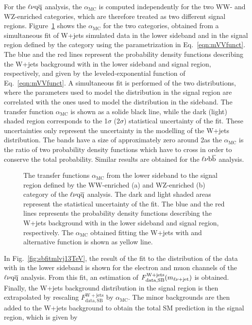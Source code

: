 For the $\ell\nu\mathrm{q}\overline{\mathrm{q}}$ analysis, the $\alpha_\mathrm{MC}$ is computed independently for the two WW- and WZ-enriched categories, which are therefore treated as two different signal regions.
Figure~\ref{fig:alphasWV_13TeV} shows the $\alpha_\mathrm{MC}$ for the two categories, obtained from a simultaneous fit of W+jets simulated data in the lower sideband and in the signal region defined by the category using the parametrization in Eq.~\ref{eqn:mVVfunct}.
The blue and the red lines represent the probability density functions describing the W+jets background with \mJ in the lower sideband and signal region, respectively, and given by the leveled-exponential function of Eq.~\ref{eqn:mVVfunct}. A simultaneous fit is performed of the two distributions, where the parameters used to model the distribution in the signal region are correlated with the ones used to model the distribution in the sideband.
The transfer function $\alpha_\mathrm{MC}$  is shown as a solide black line, while the dark (light) shaded region corresponds to the 1$\sigma$ (2$\sigma$) statistical uncertainty of the fit.
These uncertainties only represent the uncertainty in the modelling of the W+jets distribution. The bands have a size of approximately zero around 2\TeV as the $\alpha_\mathrm{MC}$ is the ratio of two probability density functions which have to cross in order to conserve the total probability. Similar results are obtained for the $\ell\nu{\mathrm{b}\overline{\mathrm{b}}}$ analysis.

\begin{figure}[!htb]
\centering
{}
\caption{The transfer functions $\alpha_\mathrm{MC}$ from the lower \mJ sideband to the signal region defined by the WW-enriched (a) and WZ-enriched (b) category of the $\ell\nu\mathrm{q}\overline{\mathrm{q}}$ analysis. The dark and light shaded areas represent the statistical uncertainty of the fit. The blue and the red lines represents the probability density functions describing the W+jets background with \mJ in the lower sideband and signal region, respectively. The $\alpha_\mathrm{MC}$ obtained fitting the W+jets with and alternative function is shown as yellow line.}
\label{fig:alphasWV_13TeV}
\end{figure}

In Fig.~\ref{fig:sbfitmlvj13TeV}, the result of the fit to the \mlvj distribution of the data with \mJ in the lower sideband is shown for the electron and muon channels of the $\ell\nu\mathrm{q}\overline{\mathrm{q}}$ analysis.
From this fit, an estimation of $F_\mathrm{data, SB}^{\mathrm{W+jets}}(m_{\ell\nu+{\rm jet}})$ is obtained.
Finally, the W+jets background distribution in the signal region is then extrapolated by rescaling $F_\mathrm{data, SB}^{\mathrm{W+jets}}$ by $\alpha_\mathrm{MC}$.
The minor backgrounds are then added to the W+jets background to obtain the total SM prediction in the signal region, which is given by

